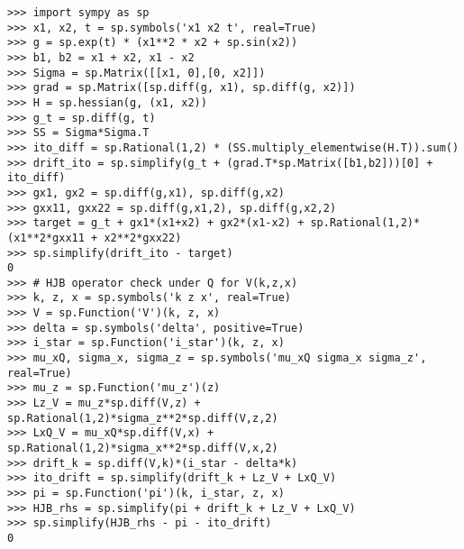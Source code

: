 \documentclass[11pt,letterpaper,oneside]{article}
\begin{document}
\begin{tcolorbox}[sympycheckstyle,title={Interactive Itô and operator checks (pycon transcript)}]
\begin{verbatim}
>>> import sympy as sp
>>> x1, x2, t = sp.symbols('x1 x2 t', real=True)
>>> g = sp.exp(t) * (x1**2 * x2 + sp.sin(x2))
>>> b1, b2 = x1 + x2, x1 - x2
>>> Sigma = sp.Matrix([[x1, 0],[0, x2]])
>>> grad = sp.Matrix([sp.diff(g, x1), sp.diff(g, x2)])
>>> H = sp.hessian(g, (x1, x2))
>>> g_t = sp.diff(g, t)
>>> SS = Sigma*Sigma.T
>>> ito_diff = sp.Rational(1,2) * (SS.multiply_elementwise(H.T)).sum()
>>> drift_ito = sp.simplify(g_t + (grad.T*sp.Matrix([b1,b2]))[0] + ito_diff)
>>> gx1, gx2 = sp.diff(g,x1), sp.diff(g,x2)
>>> gxx11, gxx22 = sp.diff(g,x1,2), sp.diff(g,x2,2)
>>> target = g_t + gx1*(x1+x2) + gx2*(x1-x2) + sp.Rational(1,2)*(x1**2*gxx11 + x2**2*gxx22)
>>> sp.simplify(drift_ito - target)
0
>>> # HJB operator check under Q for V(k,z,x)
>>> k, z, x = sp.symbols('k z x', real=True)
>>> V = sp.Function('V')(k, z, x)
>>> delta = sp.symbols('delta', positive=True)
>>> i_star = sp.Function('i_star')(k, z, x)
>>> mu_xQ, sigma_x, sigma_z = sp.symbols('mu_xQ sigma_x sigma_z', real=True)
>>> mu_z = sp.Function('mu_z')(z)
>>> Lz_V = mu_z*sp.diff(V,z) + sp.Rational(1,2)*sigma_z**2*sp.diff(V,z,2)
>>> LxQ_V = mu_xQ*sp.diff(V,x) + sp.Rational(1,2)*sigma_x**2*sp.diff(V,x,2)
>>> drift_k = sp.diff(V,k)*(i_star - delta*k)
>>> ito_drift = sp.simplify(drift_k + Lz_V + LxQ_V)
>>> pi = sp.Function('pi')(k, i_star, z, x)
>>> HJB_rhs = sp.simplify(pi + drift_k + Lz_V + LxQ_V)
>>> sp.simplify(HJB_rhs - pi - ito_drift)
0
\end{verbatim}
\end{tcolorbox}
\end{document}
